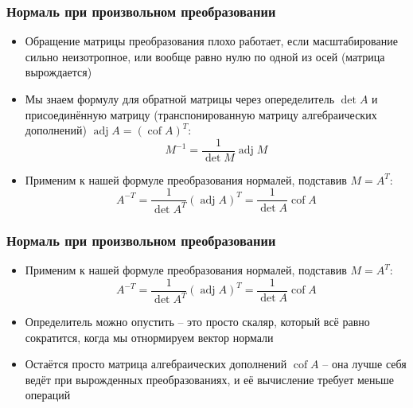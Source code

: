 \documentclass[10pt]{beamer}
\begin{document}
\begin{frame}[fragile]
\frametitle{Нормаль при произвольном преобразовании}
\begin{itemize}
\item Обращение матрицы преобразования плохо работает, если масштабирование сильно неизотропное, или вообще равно нулю по одной из осей (матрица вырождается)
\pause
\item Мы знаем формулу для обратной матрицы через опеределитель \begin{math}\det A\end{math} и присоединённую матрицу (транспонированную матрицу алгебраических дополнений) \begin{math}\operatorname{adj} A = (\operatorname{cof} A)^T\end{math}:
\begin{equation*}
M^{-1} = \frac{1}{\det M}\operatorname{adj} M
\end{equation*}
\pause
\item Применим к нашей формуле преобразования нормалей, подставив \begin{math}M = A^T\end{math}:
\begin{equation*}
A^{-T} = \frac{1}{\det {A^T}}(\operatorname{adj} A)^T = \frac{1}{\det A}\operatorname{cof} A
\end{equation*}
\end{itemize}
\end{frame}

\begin{frame}[fragile]
\frametitle{Нормаль при произвольном преобразовании}
\begin{itemize}
\item Применим к нашей формуле преобразования нормалей, подставив \begin{math}M = A^T\end{math}:
\begin{equation*}
A^{-T} = \frac{1}{\det {A^T}}(\operatorname{adj} A)^T = \frac{1}{\det A}\operatorname{cof} A
\end{equation*}
\pause
\item Определитель можно опустить -- это просто скаляр, который всё равно сократится, когда мы отнормируем вектор нормали
\pause
\item Остаётся просто матрица алгебраических дополнений \begin{math}\operatorname{cof} A\end{math} -- она лучше себя ведёт при вырожденных преобразованиях, и её вычисление требует меньше операций
\end{itemize}
\end{frame}
\end{document}
